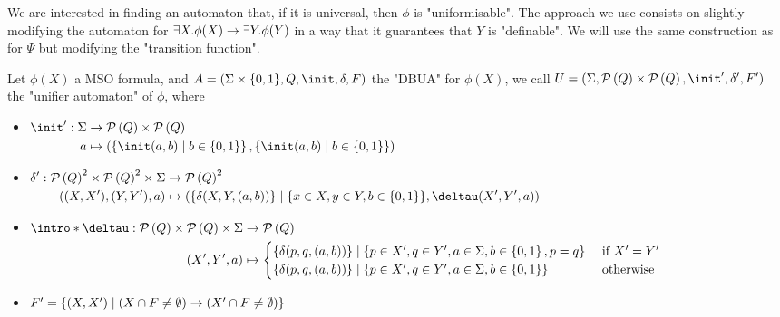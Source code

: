 \documentclass{article}
\begin{document}
We are interested in finding an automaton that, if it is universal, then $\phi$ is "uniformisable". The approach we use consists on slightly modifying
the automaton for $\exists X. \phi(X) \rightarrow \exists Y. \phi (Y)$ in a way that it guarantees that $Y$ is "definable". We will use the same construction as for $\Psi$ but modifying
the "transition function".

\begin{definition}
	Let $\phi(X)$ a MSO formula, and $A =  (\Sigma \times \{0,1\}, Q, \init, \delta, F)$ the "DBUA" for $\phi(X)$, we call $U = (\Sigma, \parts Q \times \parts Q,\init', \delta', F')$
	the "unifier automaton" of $\phi$, where
	\begin{itemize}
		\item$\begin{aligned}[t]
				      \init' : \Sigma & \to      \parts Q \times \parts {Q}                                                          \\
				      a               & \mapsto  ( \setdef{ \init(a,b) } {b \in \set{0,1}}, \setdef{ \init(a,b) } {b \in \set{0,1}})
			      \end{aligned}$
		\item$\begin{aligned}[t]
				      \delta' : {\parts Q}^2 \times {\parts {Q}}^2 \times \Sigma & \to    {\parts {Q}}^2                                                                             \\
				      ((X,X'),(Y,Y'),a)                                          & \mapsto (\{ \delta(X,Y,(a,b)) \}  \mid  \{x \in X, y \in Y, b \in \set{0,1}\}, \deltau (X',Y',a)) \\
			      \end{aligned}$
		\item $ \begin{aligned}[t]
				      \intro*\deltau : \parts Q \times \parts Q \times \Sigma & \to \parts Q                                                                                                              \\
				      (X', Y', a)                                             & \mapsto \begin{cases}
					                                                                        \{\delta(p,q,(a,b))\}     \mid \{p \in X', q \in Y', a \in \Sigma, b \in \set{0,1}, p = q\} & \text{ if } X' = Y' \\
					                                                                        \{\delta(p,q,(a,b))\}     \mid \{p \in X', q \in Y', a \in \Sigma, b \in \set{0,1} \}       & \text{ otherwise}
				                                                                        \end{cases}
			      \end{aligned}$
		\item $F' = \left\{(X,X') \mid (X \cap F \neq \emptyset) \rightarrow (X' \cap F \neq \emptyset)\right\}$
	\end{itemize}
\end{definition}
\end{document}

